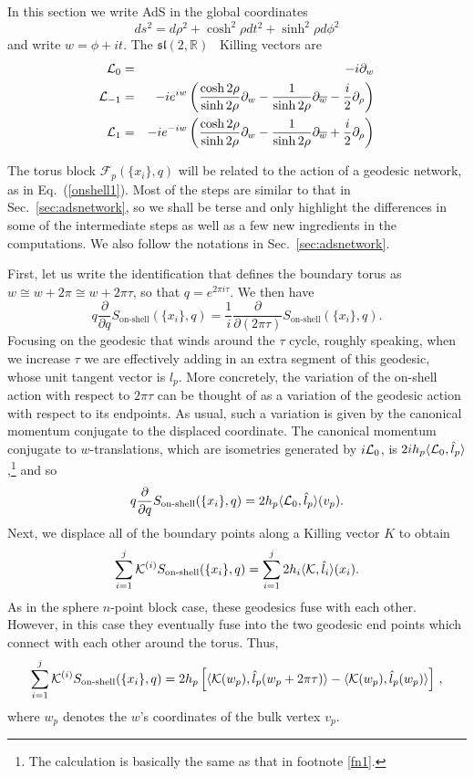 \documentclass[12pt]{article}
\def\wb{\overline{w}}
\newcommand{\sltwo}{$\lie{sl}(2,\RR)$ }
\def\Lc{\mathcal{L}}
\def\p{\partial}
\newcommand{\bea}{\begin{eqnarray}}
\newcommand{\eea}{\end{eqnarray}}
\newcommand{\RR}{\mathbb{R}}
\newcommand{\lie}[1]{\mathfrak{#1}}
\newcommand{\dw}{2\pi\tau}
\begin{document}
In this section we write AdS in the global coordinates
%
\begin{equation}
ds^2 = d\rho^2 + \cosh^2 \rho dt^2 + \sinh^2 \rho d\phi^2
\end{equation}
%
and write $w=\phi+it$. The \sltwo\ Killing vectors are
%
\bea
\Lc_0 &=& -i \p_w \cr
\Lc_{-1} & = & -i e^{iw} \left({\cosh 2\rho \over \sinh 2\rho}\p_w -{1\over \sinh 2\rho} \p_{\wb} -{i\over 2} \p_\rho\right)  \cr
\Lc_{1} & = & -i e^{-iw} \left({\cosh 2\rho \over \sinh 2\rho}\p_w -{1\over \sinh 2\rho} \p_{\wb} +{i\over 2} \p_\rho\right)
\eea



The torus block $\mathcal{F}_p(\{x_i\},q)$ will be related to the action of a geodesic network,  as in Eq.~(\ref{onshell1}). Most of the steps are similar to that in Sec.~\ref{sec:adsnetwork}, so we shall be terse and only highlight the differences in some of the intermediate steps as well as a few new ingredients in the computations. We also follow the notations in Sec.~\ref{sec:adsnetwork}.

First, let us write the identification that  defines the boundary torus as $w\cong w+ 2\pi  \cong w+\dw$, so that
 $q=e^{2\pi i \tau}$.   We then have
\begin{equation} q\frac{\partial}{\partial q}S_{\text{on-shell}}
(\{x_i\},q)
=\frac{1}{ i}\frac{\partial}{\partial (\dw)} S_{\text{on-shell}}(\{x_i\},q)
.\end{equation}
Focusing on the geodesic that winds around the $\tau$ cycle, roughly speaking, when we increase $\tau$ we are effectively adding in an extra segment of this geodesic, whose unit tangent vector is $\hat{l}_p$.
More concretely, the variation of the on-shell action with respect to $\dw$ can be thought of as a variation of the geodesic action with respect to its endpoints.   As usual, such a variation is given by the canonical momentum conjugate to the displaced coordinate.   The canonical momentum conjugate to $w$-translations, which are isometries generated by $i {\cal L}_0$, is $2ih_p \langle {\cal L}_0,\hat{l}_p \rangle$,\footnote{The calculation is basically the same as that in footnote \ref{fn1}.} and so
\begin{equation}
q\frac{\partial}{\partial q}S_{\text{on-shell}}(\{x_i\},q)
=2h_p \langle {\cal{L}}_0,\hat{l}_p\rangle(v_p)
. \end{equation}
Next, we displace all of the boundary points along a Killing vector $K$ to obtain
\begin{equation}
 \sum_{i=1}^j{\cal{K}}^{(i)} S_{\text{on-shell}}(\{x_i\},q)
 =\sum_{i=1}^j 2h_i \langle {\cal{K}},\hat{l}_i\rangle(x_i).
\end{equation}
As in the sphere $n$-point block case, these geodesics fuse with each other. However, in this case they eventually fuse into the two geodesic end points  which connect with each other around the torus. Thus,
\begin{equation} \sum_{i=1}^j{\cal{K}}^{(i)} S_{\text{on-shell}}(\{x_i\},q)
=2h_p\left[
\langle {\cal{K}}(w_p),\hat{l}_p(w_p+\dw)\rangle
-\langle {\cal{K}}(w_p),\hat{l}_p(w_p) \rangle
\right] \,,\label{aa}
\end{equation}  where $w_p$ denotes the $w$'s coordinates of the bulk vertex $v_p$.
\end{document}
